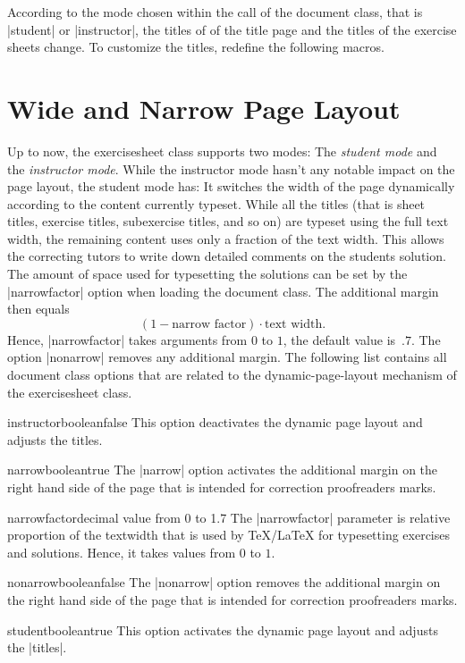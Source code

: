 \documentclass[a4paper,fleqn,9pt]{report}
\def\exercisesheet{{exercisesheet}}
\begin{document}
According to the mode chosen within the call of the document class,
that is |student| or |instructor|, the titles of of the title page and
the titles of the exercise sheets change. To customize the titles,
redefine the following macros.


\section{Wide and Narrow Page Layout}

Up to now, the \exercisesheet{} class supports two modes: The
\emph{student mode} and the \emph{instructor mode}. While the
instructor mode hasn't any notable impact on the page layout, the
student mode has: It switches the width of the page dynamically
according to the content currently typeset. While all the titles (that
is sheet titles, exercise titles, subexercise titles, and so on) are
typeset using the full text width, the remaining content uses only a
fraction of the text width. This allows the correcting tutors to write
down detailed comments on the students solution. The amount of space
used for typesetting the solutions can be set by the
|narrowfactor| option when loading the document class. The
additional margin then equals 
\begin{equation*}
  (1 - \text{narrow factor}) \cdot \text{text width}.
\end{equation*}
Hence, |narrowfactor| takes arguments from $0$ to $1$, the default
value is~$.7$. The option |nonarrow| removes any additional margin.
The following list contains all document class options that are
related to the dynamic-page-layout mechanism of the \exercisesheet{}
class.

\begin{documentoption}{instructor}{boolean}{false}
  This option deactivates the dynamic page layout and adjusts the
  titles.
\end{documentoption}

\begin{documentoption}{narrow}{boolean}{true}
  The |narrow| option activates the additional margin on the
  right hand side of the page that is intended for correction
  proofreaders marks. 
\end{documentoption}

\begin{documentoption}{narrowfactor}{decimal value from 0 to 1}{.7}
  The |narrowfactor| parameter is relative proportion of the
  textwidth that is used by \TeX{}/\LaTeX{} for typesetting exercises
  and solutions. Hence, it takes values from $0$ to $1$.
\end{documentoption}

\begin{documentoption}{nonarrow}{boolean}{false}
  The |nonarrow| option removes the additional margin on the
  right hand side of the page that is intended for correction
  proofreaders marks. 
\end{documentoption}

\begin{documentoption}{student}{boolean}{true}
  This option activates the dynamic page layout and adjusts the
  |titles|. 
\end{documentoption}
\end{document}
